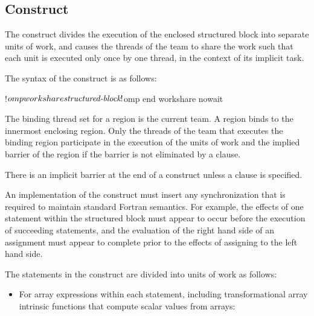 \vspace{1ex}  %
\begin{fortranspecific}
\vspace{-7ex}  %
\subsection{ Construct}
\label{subsec:workshare Construct}
\summary
The  construct divides the execution of the enclosed structured 
block into separate units of work, and causes the threads of the team to share 
the work such that each unit is executed only once by one thread, in the context 
of its implicit task.

\syntax
The syntax of the  construct is as follows:

\begin{ompfPragma}
!$omp workshare
    \plc{structured-block}
!$omp end workshare \plc{[}nowait\plc{]}
\end{ompfPragma}

\binding
The binding thread set for a  region is the current team. 
A  region binds to the innermost enclosing  
region. Only the threads of the team that executes the binding  
region participate in the execution of the units of work and the implied 
barrier of the  region if the barrier is not eliminated
by a  clause.

\descr
There is an implicit barrier at the end of a  construct 
unless a  clause is specified.

An implementation of the  construct must insert any synchronization 
that is required to maintain standard Fortran semantics. For example, the effects 
of one statement within the structured block must appear to occur before the 
execution of succeeding statements, and the evaluation of the right hand side of 
an assignment must appear to complete prior to the effects of assigning to the left 
hand side. 

The statements in the  construct are divided into units of work 
as follows:

\begin{itemize}
\item For array expressions within each statement, including transformational 
      array intrinsic functions that compute scalar values from arrays:


\end{itemize}
\end{fortranspecific}
